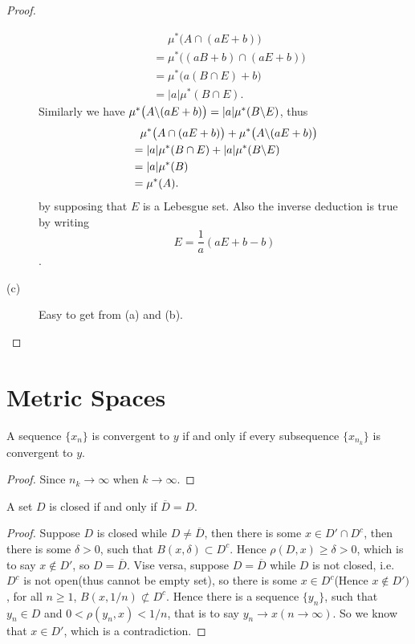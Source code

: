 \begin{proof}
\begin{description}
	\begin{align*}
		&\phantom{=}\mu^*\big(A\cap(aE+b)\big)\\
		&=\mu^*\big((aB+b)\cap (aE+b)\big)\\
		&=\mu^*\big(a(B\cap E)+b\big)\\
		&=|a|\mu^*(B\cap E).
	\end{align*}
	Similarly we have $\mu^*\big(A\backslash(aE+b)\big)=|a|\mu^*(B\backslash E)$, thus 
	\begin{align*}
		&\phantom{=}\mu^*\big(A\cap(aE+b)\big)+\mu^*\big(A\backslash(aE+b)\big)\\
		&=|a|\mu^*(B\cap E)+|a|\mu^*(B\backslash E)\\
		&=|a|\mu^*(B)\\
		&=\mu^*(A).
	\end{align*}
	by supposing that $E$ is a Lebesgue set. Also the inverse deduction is true by writing \[E=\frac{1}{a}(aE+b-b)\].
	\item[(c)] Easy to get from (a) and (b).
	\end{description}
\end{proof}

\section{Metric Spaces}
\begin{pro}%
	A sequence $\{x_n\}$ is convergent to $y$ if and only if every subsequence $\{x_{n_k}\}$ is convergent to $y$.
\end{pro}
\begin{proof}
	Since $n_{k}\to\infty$ when $k\to\infty$.
\end{proof}

\begin{pro}%
	A set $D$ is closed if and only if $\overline{D}=D$.
\end{pro}
\begin{proof}
	Suppose $D$ is closed while $D\neq\overline{D}$, then there is some $x\in D'\cap D^c$, then there is some $\delta>0$, such that
	$B(x,\delta)\subset D^c$. Hence $\rho(D,x)\geq \delta>0$, which is to say $x\not\in D'$, so $D=\overline{D}$. Vise versa, suppose $D=\overline{D}$ while $D$ is not closed, i.e. $D^c$ is not open(thus cannot be empty set), so there is some $x\in D^c$(Hence $x\not\in D')$, for all $n\geq 1$,
	$B(x,1/n)\not\subset D^c$. Hence there is a sequence $\{y_n\}$, such that $y_n\in D$ and $0<\rho (y_n,x)<1/n$, that is to say
	$y_n\to x(n\to\infty)$. So we know that $x\in D'$, which is a  contradiction.
\end{proof}

